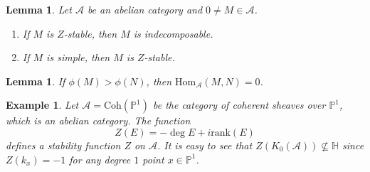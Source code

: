\documentclass[a4paper,12pt]{amsart}
\newtheorem{lemma}[theorem]{Lemma}
\newtheorem{example}[theorem]{Example}
\newcommand{\Hom}{\mathrm{Hom}}
\newcommand{\Coh}{\mathrm{Coh}}
\newcommand{\rank}{\mathrm{rank}}
\begin{document}
\begin{lemma}\label{stable,indecomposable,simple}
Let $\mathcal{A}$ be an abelian category and $0\neq M\in\mathcal{A}$.
\begin{enumerate}
    \item If $M$ is $Z$-stable, then $M$ is indecomposable.
    \item If $M$ is simple, then $M$ is $Z$-stable.
\end{enumerate}
\end{lemma}
\begin{lemma}\label{hom to phi big}
    If $\phi(M)>\phi(N)$, then $\Hom_\mathcal{A}(M,N)=0$.
\end{lemma}
\begin{example}
    Let $\mathcal{A}=\Coh(\mathbb{P}^1)$ be the category of coherent sheaves over $\mathbb{P}^1$, which is an abelian category. The function
    \[Z(E)=-\deg E+i\rank(E)\]
    defines a stability function $Z$ on $\mathcal{A}$. It is easy to see that $Z(K_0(\mathcal{A}))\not\subseteq\mathbb{H}$ since $Z(k_x)=-1$ for any degree $1$ point $x\in\mathbb{P}^1$.
\end{example}
\end{document}
